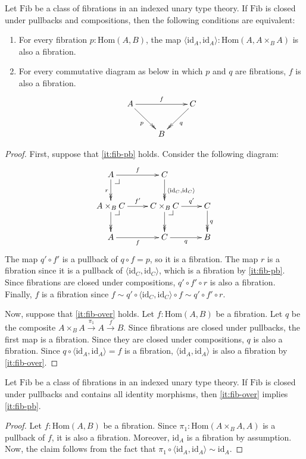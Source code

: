 \documentclass[reqno]{amsart}
\makeatletter
\theoremstyle{definition}
\theoremstyle{remark}
\newcommand{\fs}[1]{\mathrm{#1}}
\newcommand{\Hom}{\fs{Hom}}
\newcommand{\id}{\fs{id}}
\newcommand{\Fib}{\fs{Fib}}
\numberwithin{figure}{section}
\newcommand{\pb}[1][dr]{\save*!/#1-1.2pc/#1:(-1,1)@^{|-}\restore}
\makeatother
\begin{document}
\begin{prop}
Let $\Fib$ be a class of fibrations in an indexed unary type theory.
If $\Fib$ is closed under pullbacks and compositions, then the following conditions are equivalent:
\begin{enumerate}
\item \label{it:fib-pb} For every fibration $p : \Hom(A,B)$, the map $\langle \id_A, \id_A \rangle : \Hom(A, A \times_B A)$ is also a fibration.
\item \label{it:fib-over} For every commutative diagram as below in which $p$ and $q$ are fibrations, $f$ is also a fibration.
\[ \xymatrix{ A \ar[rr]^f \ar@{->>}[dr]_p &   & C \ar@{->>}[dl]^q \\
                                          & B &
            }\]
\end{enumerate}
\end{prop}
\begin{proof}
First, suppose that \eqref{it:fib-pb} holds.
Consider the following diagram:
\[ \xymatrix{ A \ar[r]^f \ar@{->>}[d]_r \pb             & C \ar@{->>}[d]^{\langle \id_C, \id_C \rangle} & \\
              A \times_B C \ar[r]^{f'} \ar@{->>}[d] \pb & C \times_B C \ar[r]^-{q'} \ar@{->>}[d] \pb    & C \ar@{->>}[d]^q \\
              A \ar[r]_f                                & C \ar[r]_q                                    & B
            } \]
The map $q' \circ f'$ is a pullback of $q \circ f = p$, so it is a fibration.
The map $r$ is a fibration since it is a pullback of $\langle \id_C, \id_C \rangle$, which is a fibration by \eqref{it:fib-pb}.
Since fibrations are closed under compositions, $q' \circ f' \circ r$ is also a fibration.
Finally, $f$ is a fibration since $f \sim q' \circ \langle \id_C, \id_C \rangle \circ f \sim q' \circ f' \circ r$.

Now, suppose that \eqref{it:fib-over} holds.
Let $f : \Hom(A,B)$ be a fibration.
Let $q$ be the composite $A \times_B A \xrightarrow{\pi_1} A \xrightarrow{f} B$.
Since fibrations are closed under pullbacks, the first map is a fibration.
Since they are closed under compositions, $q$ is also a fibration.
Since $q \circ \langle \id_A, \id_A \rangle = f$ is a fibration, $\langle \id_A, \id_A \rangle$ is also a fibration by \eqref{it:fib-over}.
\end{proof}

\begin{lem}
Let $\Fib$ be a class of fibrations in an indexed unary type theory.
If $\Fib$ is closed under pullbacks and contains all identity morphisms, then \eqref{it:fib-over} implies \eqref{it:fib-pb}.
\end{lem}
\begin{proof}
Let $f : \Hom(A,B)$ be a fibration.
Since $\pi_1 : \Hom(A \times_B A, A)$ is a pullback of $f$, it is also a fibration.
Moreover, $\id_A$ is a fibration by assumption.
Now, the claim follows from the fact that $\pi_1 \circ \langle \id_A, \id_A \rangle \sim \id_A$.
\end{proof}
\end{document}
